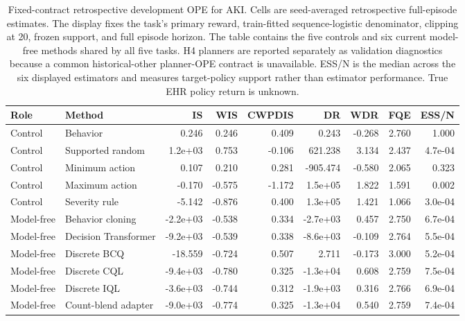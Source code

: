 \begin{table}[p]
\centering
\caption{Fixed-contract retrospective development OPE for AKI. Cells are seed-averaged retrospective full-episode estimates. The display fixes the task's primary reward, train-fitted sequence-logistic denominator, clipping at 20, frozen support, and full episode horizon. The table contains the five controls and six current model-free methods shared by all five tasks. H4 planners are reported separately as validation diagnostics because a common historical-other planner-OPE contract is unavailable. ESS/N is the median across the six displayed estimators and measures target-policy support rather than estimator performance. True EHR policy return is unknown.}
\label{tab:ope-estimator-aki}
\scriptsize
\setlength{\tabcolsep}{3.6pt}
\begin{tabular}{llrrrrrrr}
\toprule
Role & Method & IS & WIS & CWPDIS & DR & WDR & FQE & ESS/N \\
\midrule
Control & Behavior & 0.246 & 0.246 & 0.409 & 0.243 & -0.268 & 2.760 & 1.000 \\
Control & Supported random & 1.2e+03 & 0.753 & -0.106 & 621.238 & 3.134 & 2.437 & 4.7e-04 \\
Control & Minimum action & 0.107 & 0.210 & 0.281 & -905.474 & -0.580 & 2.065 & 0.323 \\
Control & Maximum action & -0.170 & -0.575 & -1.172 & 1.5e+05 & 1.822 & 1.591 & 0.002 \\
Control & Severity rule & -5.142 & -0.876 & 0.400 & 1.3e+05 & 1.421 & 1.066 & 3.0e-04 \\
\midrule
Model-free & Behavior cloning & -2.2e+03 & -0.538 & 0.334 & -2.7e+03 & 0.457 & 2.750 & 6.7e-04 \\
Model-free & Decision Transformer & -9.2e+03 & -0.539 & 0.338 & -8.6e+03 & -0.109 & 2.764 & 5.5e-04 \\
Model-free & Discrete BCQ & -18.559 & -0.724 & 0.507 & 2.711 & -0.173 & 3.000 & 5.2e-04 \\
Model-free & Discrete CQL & -9.4e+03 & -0.780 & 0.325 & -1.3e+04 & 0.608 & 2.759 & 7.5e-04 \\
Model-free & Discrete IQL & -3.6e+03 & -0.744 & 0.312 & -1.9e+03 & 0.316 & 2.766 & 6.9e-04 \\
Model-free & Count-blend adapter & -9.0e+03 & -0.774 & 0.325 & -1.3e+04 & 0.540 & 2.759 & 7.4e-04 \\
\bottomrule
\end{tabular}
\end{table}

